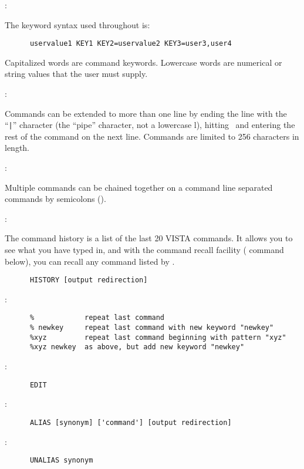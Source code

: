 \noindent {}:

The keyword syntax used throughout is:
\begin{verbatim}
      uservalue1 KEY1 KEY2=uservalue2 KEY3=user3,user4
\end{verbatim}
Capitalized words are command keywords.  Lowercase words are numerical or
string values that the user must supply.

\noindent {}:

Commands can be extended to more than one line by ending the line with the
``\verb+|+'' character (the ``pipe'' character, not a lowercase l), hitting
\ and entering the rest of the command on the next line.
Commands are limited to 256 characters in length.

\noindent {}:

Multiple commands can be chained together on a command line separated commands
by semicolons (\comm{;}).

\noindent {}:

The command history is a list of the last 20 VISTA commands.  It allows you to
see what you have typed in, and with the command recall facility (\comm{\%}
command below), you can recall any command listed by .

\begin{verbatim}
      HISTORY [output redirection]
\end{verbatim}

\noindent {}:
\begin{verbatim}
      %            repeat last command
      % newkey     repeat last command with new keyword "newkey"
      %xyz         repeat last command beginning with pattern "xyz"
      %xyz newkey  as above, but add new keyword "newkey"
\end{verbatim}

\noindent {}:
\begin{verbatim}
      EDIT
\end{verbatim}

\noindent {}:
\begin{verbatim}
      ALIAS [synonym] ['command'] [output redirection]
\end{verbatim}

\noindent {}:
\begin{verbatim}
      UNALIAS synonym
\end{verbatim}

